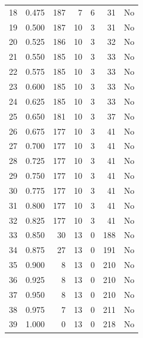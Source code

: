 \documentclass[a4paper,twoside,12pt]{book}
\begin{document}
\begin{appendices}
\begin{table}
\begin{tabular}{lrrrrrr}
		18 &  0.475 &       187 &         7 &               6 &              31 &     No \\
		19 &  0.500 &       187 &        10 &               3 &              31 &     No \\
		20 &  0.525 &       186 &        10 &               3 &              32 &     No \\
		21 &  0.550 &       185 &        10 &               3 &              33 &     No \\
		22 &  0.575 &       185 &        10 &               3 &              33 &     No \\
		23 &  0.600 &       185 &        10 &               3 &              33 &     No \\
		24 &  0.625 &       185 &        10 &               3 &              33 &     No \\
		25 &  0.650 &       181 &        10 &               3 &              37 &     No \\
		26 &  0.675 &       177 &        10 &               3 &              41 &     No \\
		27 &  0.700 &       177 &        10 &               3 &              41 &     No \\
		28 &  0.725 &       177 &        10 &               3 &              41 &     No \\
		29 &  0.750 &       177 &        10 &               3 &              41 &     No \\
		30 &  0.775 &       177 &        10 &               3 &              41 &     No \\
		31 &  0.800 &       177 &        10 &               3 &              41 &     No \\
		32 &  0.825 &       177 &        10 &               3 &              41 &     No \\
		33 &  0.850 &        30 &        13 &               0 &             188 &     No \\
		34 &  0.875 &        27 &        13 &               0 &             191 &     No \\
		35 &  0.900 &         8 &        13 &               0 &             210 &     No \\
		36 &  0.925 &         8 &        13 &               0 &             210 &     No \\
		37 &  0.950 &         8 &        13 &               0 &             210 &     No \\
		38 &  0.975 &         7 &        13 &               0 &             211 &     No \\
		39 &  1.000 &         0 &        13 &               0 &             218 &     No \\
		\bottomrule
	\end{tabular}
\end{table} 


\end{appendices}
\end{document}
